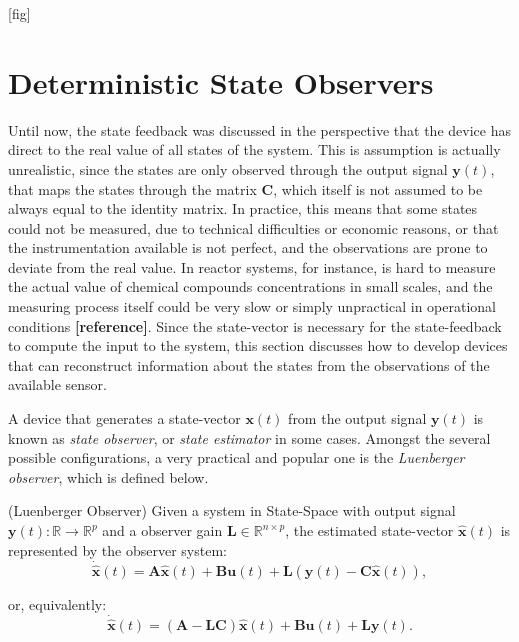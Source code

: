 \documentclass[a4paper,11pt]{book}
\numberwithin{figure}{chapter}
\numberwithin{equation}{chapter}
\numberwithin{table}{chapter}
\theoremstyle{definition}
\newtheorem{definition}{Definition}[chapter]
\newcounter{boxed-theorem}
\newcounter{boxed-definition}
\newenvironment{boxed-definition}[1]
{\begin{shaded} \begin{definition}{#1}}
{\end{definition} \end{shaded}}
\begin{document}
[fig]


\section{Deterministic State Observers}

Until now, the state feedback was discussed in the perspective that the device has direct to the real value of all states of the system. This is assumption is actually unrealistic, since the states are only observed through the output signal $\bm{y}(t)$, that maps the states through the matrix $\bm{C}$, which itself is not assumed to be always equal to the identity matrix. In practice, this means that some states could not be measured, due to technical difficulties or economic reasons, or that the instrumentation available is not perfect, and the observations are prone to deviate from the real value. In reactor systems, for instance, is hard to measure the actual value of chemical compounds concentrations in small scales, and the measuring process itself could be very slow or simply unpractical in operational conditions \textbf{[reference]}. Since the state-vector is necessary for the state-feedback to compute the input to the system, this section discusses how to develop devices that can reconstruct information about the states from the observations of the available sensor.

A device that generates a state-vector $\bm{x}(t)$ from the output signal $\bm{y}(t)$ is known as \textit{state observer}, or \textit{state estimator} in some cases. Amongst the several possible configurations, a very practical and popular one is the \textit{Luenberger observer}, which is defined below.

\begin{boxed-definition}{(Luenberger Observer)} \label{def:luenberger}
    Given a system in State-Space with output signal $\bm{y}(t) : \mathbb{R} \rightarrow \mathbb{R}^p$ and a observer gain $\bm{L} \in \mathbb{R}^{n \times p}$, the estimated state-vector $\hat{\bm{x}}(t)$ is represented by the observer system:
    \begin{equation}
        \dot{\hat{\bm{x}}}(t) = \bm{A} \hat{\bm{x}}(t) + \bm{B} \bm{u}(t) + \bm{L} \left( \bm{y}(t) - \bm{C} \hat{\bm{x}}(t) \right)
    ,\end{equation}
    
    \noindent or, equivalently:
    \begin{equation} \label{eq:luenberger02}
        \dot{\hat{\bm{x}}}(t) = \left( \bm{A} - \bm{L} \bm{C} \right) \hat{\bm{x}}(t) + \bm{B} \bm{u}(t) + \bm{L} \bm{y}(t)
    .\end{equation}
\end{boxed-definition}
\end{document}
